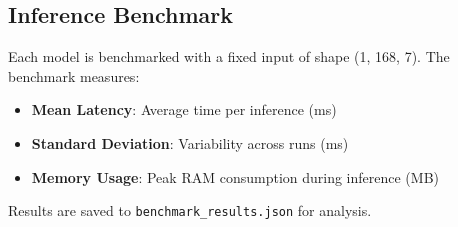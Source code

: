 \subsection{Inference Benchmark}

Each model is benchmarked with a fixed input of shape (1, 168, 7). The benchmark measures:
\begin{itemize}
    \item \textbf{Mean Latency}: Average time per inference (ms)
    \item \textbf{Standard Deviation}: Variability across runs (ms)
    \item \textbf{Memory Usage}: Peak RAM consumption during inference (MB)
\end{itemize}

Results are saved to \texttt{benchmark\_results.json} for analysis.
